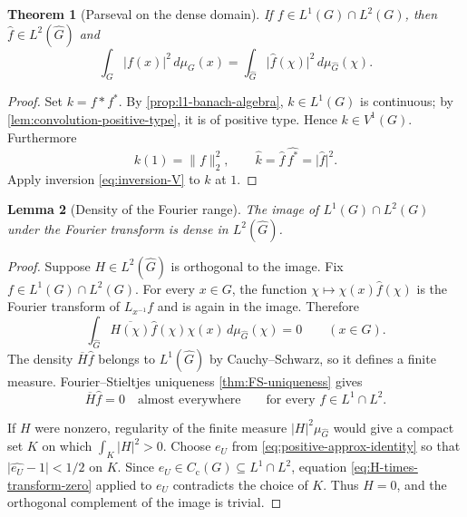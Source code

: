 \documentclass[11pt]{article}
\newtheorem{theorem}{Theorem}[section]
\newtheorem{lemma}[theorem]{Lemma}
\theoremstyle{definition}
\theoremstyle{remark}
\newcommand{\Cc}{C_{\mathrm c}}
\newcommand{\Lp}[1]{L^{#1}}
\newcommand{\dual}[1]{\widehat{#1}}
\newcommand{\abs}[1]{\lvert #1\rvert}
\newcommand{\norm}[1]{\lVert #1\rVert}
\begin{document}
\begin{theorem}[Parseval on the dense domain]
\label{thm:parseval-dense}
If $f\in\Lp1(G)\cap\Lp2(G)$, then $\widehat f\in\Lp2(\dual G)$ and
\begin{equation}
  \int_G\abs{f(x)}^2\,d\mu_G(x)
  =\int_{\dual G}\abs{\widehat f(\chi)}^2\,d\mu_{\dual G}(\chi).
  \label{eq:parseval-dense}
\end{equation}
\end{theorem}

\begin{proof}
Set $k=f*f^*$.  By \cref{prop:l1-banach-algebra}, $k\in\Lp1(G)$ is continuous; by
\cref{lem:convolution-positive-type}, it is of positive type.  Hence $k\in V^1(G)$.
Furthermore
\[
  k(1)=\norm f_2^2,
  \qquad \widehat k=\widehat f\,\widehat{f^*}=\abs{\widehat f}^2.
\]
Apply inversion \eqref{eq:inversion-V} to $k$ at $1$.
\end{proof}

\begin{lemma}[Density of the Fourier range]
\label{lem:plancherel-range-dense}
The image of $\Lp1(G)\cap\Lp2(G)$ under the Fourier transform is dense in
$\Lp2(\dual G)$.
\end{lemma}

\begin{proof}
Suppose $H\in\Lp2(\dual G)$ is orthogonal to the image.  Fix
$f\in\Lp1(G)\cap\Lp2(G)$.  For every $x\in G$, the function
$\chi\mapsto\chi(x)\widehat f(\chi)$ is the Fourier transform of
$L_{x^{-1}}f$ and is again in the image.  Therefore
\[
  \int_{\dual G}\overline{H(\chi)}\widehat f(\chi)\chi(x)
       \,d\mu_{\dual G}(\chi)=0
  \qquad(x\in G).
\]
The density $\overline H\widehat f$ belongs to $\Lp1(\dual G)$ by Cauchy--Schwarz, so
it defines a finite measure.  Fourier--Stieltjes uniqueness
\cref{thm:FS-uniqueness} gives
\begin{equation}
  \overline H\widehat f=0\quad\text{almost everywhere}
  \qquad\text{for every }f\in\Lp1\cap\Lp2.
  \label{eq:H-times-transform-zero}
\end{equation}

If $H$ were nonzero, regularity of the finite measure
$\abs H^2\mu_{\dual G}$ would give a compact set $K$ on which
$\int_K\abs H^2>0$.  Choose $e_U$ from
\eqref{eq:positive-approx-identity} so that
$\abs{\widehat{e_U}-1}<1/2$ on $K$.  Since
$e_U\in\Cc(G)\subseteq\Lp1\cap\Lp2$, equation
\eqref{eq:H-times-transform-zero} applied to $e_U$ contradicts the choice of $K$.
Thus $H=0$, and the orthogonal complement of the image is trivial.
\end{proof}
\end{document}
